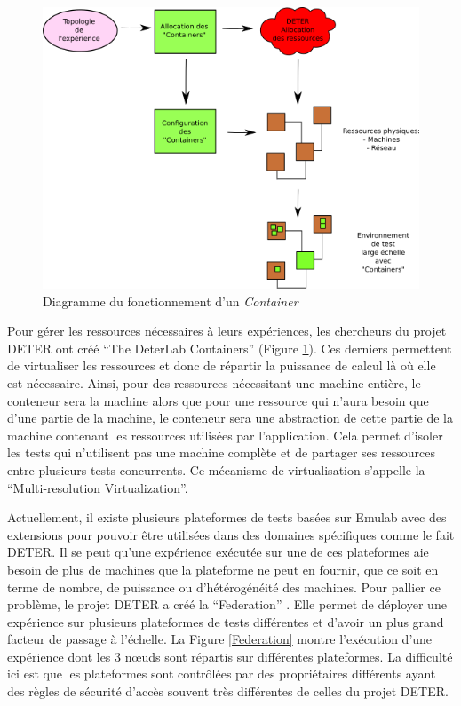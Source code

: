 \begin{figure}
  \centering \includegraphics[scale=0.75]{Pictures/png/Deter_fonctionnement_container_v2}
  \caption{Diagramme du fonctionnement d'un \textit{Container}}
  \label{Conteneur}
\end{figure}

Pour gérer les ressources nécessaires à leurs expériences, les
chercheurs du projet DETER ont créé ``The DeterLab Containers''
(Figure \ref{Conteneur}). Ces derniers permettent de virtualiser les
ressources et donc de répartir la puissance de calcul là où elle est
nécessaire. Ainsi, pour des ressources nécessitant une machine entière,
le conteneur sera la machine alors que pour une ressource qui n'aura
besoin que d'une partie de la machine, le conteneur sera une
abstraction de cette partie de la machine contenant les ressources
utilisées par l'application. Cela permet d'isoler les tests qui
n'utilisent pas une machine complète et de partager ses ressources
entre plusieurs tests concurrents. Ce mécanisme de virtualisation
s'appelle la ``Multi-resolution Virtualization''.

Actuellement, il existe plusieurs plateformes de tests basées sur Emulab avec
des extensions pour pouvoir être utilisées dans des domaines spécifiques comme
le fait DETER. Il se peut qu'une expérience exécutée sur une de ces plateformes
aie besoin de plus de machines que la plateforme ne peut en fournir, que ce soit
en terme de nombre, de puissance ou d'hétérogénéité des machines. Pour pallier
ce problème, le projet DETER a créé la
``Federation'' \citep{DETER_faber2007deter}. Elle permet de déployer une
expérience sur plusieurs plateformes de tests différentes et d'avoir un plus
grand facteur de passage à l'échelle. La Figure \ref{Federation} montre
l'exécution d'une expérience dont les 3 n\oe uds sont répartis sur différentes
plateformes. La difficulté ici est que les plateformes sont contrôlées par des
propriétaires différents ayant des règles de sécurité d'accès souvent très
différentes de celles du projet DETER.

